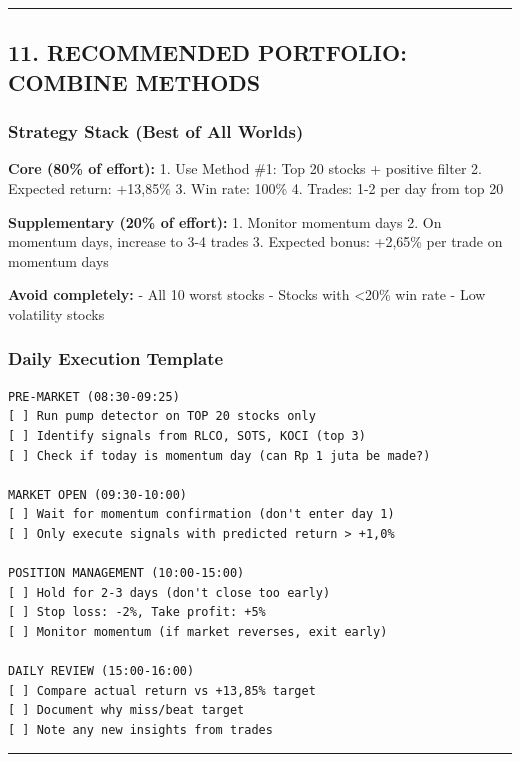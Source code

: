 \documentclass[
  10pt,
  a4paper,
]{article}
\begin{document}
\begin{center}\rule{0.5\linewidth}{0.5pt}\end{center}

\subsection{11. RECOMMENDED PORTFOLIO: COMBINE
METHODS}\label{recommended-portfolio-combine-methods}

\subsubsection{Strategy Stack (Best of All
Worlds)}\label{strategy-stack-best-of-all-worlds}

\textbf{Core (80\% of effort):} 1. Use Method \#1: Top 20 stocks +
positive filter 2. Expected return: +13,85\% 3. Win rate: 100\% 4.
Trades: 1-2 per day from top 20

\textbf{Supplementary (20\% of effort):} 1. Monitor momentum days 2. On
momentum days, increase to 3-4 trades 3. Expected bonus: +2,65\% per
trade on momentum days

\textbf{Avoid completely:} - All 10 worst stocks - Stocks with
\textless20\% win rate - Low volatility stocks

\subsubsection{Daily Execution Template}\label{daily-execution-template}

\begin{verbatim}
PRE-MARKET (08:30-09:25)
[ ] Run pump detector on TOP 20 stocks only
[ ] Identify signals from RLCO, SOTS, KOCI (top 3)
[ ] Check if today is momentum day (can Rp 1 juta be made?)

MARKET OPEN (09:30-10:00)
[ ] Wait for momentum confirmation (don't enter day 1)
[ ] Only execute signals with predicted return > +1,0%

POSITION MANAGEMENT (10:00-15:00)
[ ] Hold for 2-3 days (don't close too early)
[ ] Stop loss: -2%, Take profit: +5%
[ ] Monitor momentum (if market reverses, exit early)

DAILY REVIEW (15:00-16:00)
[ ] Compare actual return vs +13,85% target
[ ] Document why miss/beat target
[ ] Note any new insights from trades
\end{verbatim}

\begin{center}\rule{0.5\linewidth}{0.5pt}\end{center}
\end{document}
